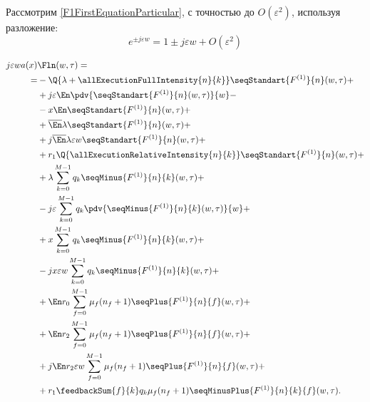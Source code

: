 Рассмотрим \eqref{F1FirstEquationParticular}, с точностью до \(O(\varepsilon^2)\),
используя разложение:
\[e^{\pm j \varepsilon w} = 1 \pm j \varepsilon w + O(\varepsilon^2)\]

\begin{equation}\begin{aligned}\label{F1FirstPrecisionEquationParticular}
j\varepsilon wa(x) &\Fln (w,\tau) = \\
   =&-\Q{\lambda+\allExecutionFullIntensity{n}{k}}\seqStandart{F^{(1)}}{n}(w,\tau)+\\
    &+j \varepsilon \En \pdv{\seqStandart{F^{(1)}}{n}(w,\tau)}{w} - \\
    &-x \En \seqStandart{F^{(1)}}{n}(w,\tau) + \\
    &+\overline{\En} \lambda \seqStandart{F^{(1)}}{n}(w,\tau)+\\
    &+j \overline{\En} \lambda \varepsilon w \seqStandart{F^{(1)}}{n}(w,\tau)+\\
    &+r_1 \Q{\allExecutionRelativeIntensity{n}{k}} \seqStandart{F^{(1)}}{n}(w,\tau) + \\
    &+\lambda\sum_{k=0}^{M-1}q_k \seqMinus{F^{(1)}}{n}{k}(w,\tau) + \\
    &-j \varepsilon \sum_{k=0}^{M-1}q_k \pdv{\seqMinus{F^{(1)}}{n}{k}(w,\tau)}{w} + \\
    &+x \sum_{k=0}^{M-1}q_k \seqMinus{F^{(1)}}{n}{k}(w,\tau) + \\
    &-jx \varepsilon w \sum_{k=0}^{M-1}q_k \seqMinus{F^{(1)}}{n}{k}(w,\tau) + \\
    &+\En r_0 \sum_{f=0}^{M-1} \mu_f (n_f + 1) \seqPlus{F^{(1)}}{n}{f}(w,\tau) + \\
    &+\En r_2 \sum_{f=0}^{M-1} \mu_f (n_f + 1) \seqPlus{F^{(1)}}{n}{f}(w,\tau) + \\
    &+j \En r_2 \varepsilon w \sum_{f=0}^{M-1} \mu_f (n_f + 1) \seqPlus{F^{(1)}}{n}{f}(w,\tau) + \\
    &+r_1 \feedbackSum{f}{k}
        q_k \mu_f (n_f+1) \seqMinusPlus{F^{(1)}}{n}{k}{f}(w,\tau).
\end{aligned}\end{equation}

